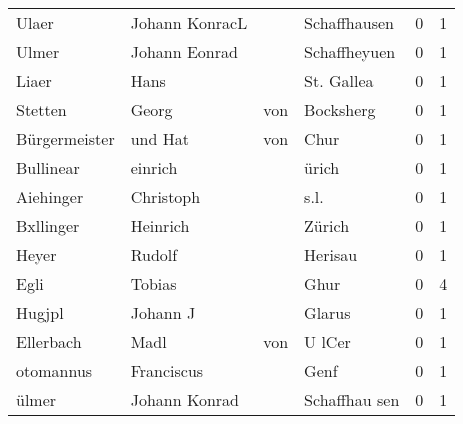 \begin{center}
\begin{tiny}
\begin{longtabu}{llllrr}
                    Ulaer &                     Johann KonracL &             &                                Schaffhausen &          0 &         1 \\
                    Ulmer &                      Johann Eonrad &             &                                Schaffheyuen &          0 &         1 \\
                    Liaer &                               Hans &             &                                  St. Gallea &          0 &         1 \\
                  Stetten &                              Georg &         von &                                   Bocksherg &          0 &         1 \\
            Bürgermeister &                            und Hat &         von &                                        Chur &          0 &         1 \\
                Bullinear &                            einrich &             &                                       ürich &          0 &         1 \\
                Aiehinger &                          Christoph &             &                                        s.l. &          0 &         1 \\
                Bxllinger &                           Heinrich &             &                                      Zürich &          0 &         1 \\
                    Heyer &                             Rudolf &             &                                     Herisau &          0 &         1 \\
                     Egli &                             Tobias &             &                                        Ghur &          0 &         4 \\
                   Hugjpl &                           Johann J &             &                                      Glarus &          0 &         1 \\
                Ellerbach &                               Madl &         von &                                      U lCer &          0 &         1 \\
                otomannus &                         Franciscus &             &                                        Genf &          0 &         1 \\
                    ülmer &                      Johann Konrad &             &                               Schaffhau sen &          0 &         1 \\

\end{longtabu}
\end{tiny}
\end{center}
